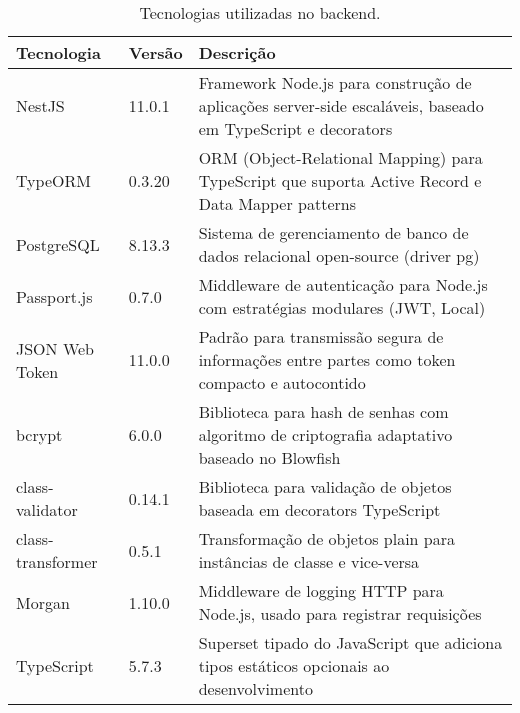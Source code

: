\begin{table}[H]
  \centering
  \caption{Tecnologias utilizadas no backend.}
  \label{tab:tecnologias-backend}
  \begin{tabular}{|p{3cm}|p{2cm}|p{8cm}|}
    \hline
    \textbf{Tecnologia} & \textbf{Versão} & \textbf{Descrição}                                                                                         \\
    \hline
    NestJS              & 11.0.1          & Framework Node.js para construção de aplicações server-side escaláveis, baseado em TypeScript e decorators \\
    \hline
    TypeORM             & 0.3.20          & ORM (Object-Relational Mapping) para TypeScript que suporta Active Record e Data Mapper patterns           \\
    \hline
    PostgreSQL          & 8.13.3          & Sistema de gerenciamento de banco de dados relacional open-source (driver pg)                              \\
    \hline
    Passport.js         & 0.7.0           & Middleware de autenticação para Node.js com estratégias modulares (JWT, Local)                             \\
    \hline
    JSON Web Token      & 11.0.0          & Padrão para transmissão segura de informações entre partes como token compacto e autocontido               \\
    \hline
    bcrypt              & 6.0.0           & Biblioteca para hash de senhas com algoritmo de criptografia adaptativo baseado no Blowfish                \\
    \hline
    class-validator     & 0.14.1          & Biblioteca para validação de objetos baseada em decorators TypeScript                                      \\
    \hline
    class-transformer   & 0.5.1           & Transformação de objetos plain para instâncias de classe e vice-versa                                      \\
    \hline
    Morgan              & 1.10.0          & Middleware de logging HTTP para Node.js, usado para registrar requisições                                  \\
    \hline
    TypeScript          & 5.7.3           & Superset tipado do JavaScript que adiciona tipos estáticos opcionais ao desenvolvimento                    \\
    \hline
  \end{tabular}
\end{table}

